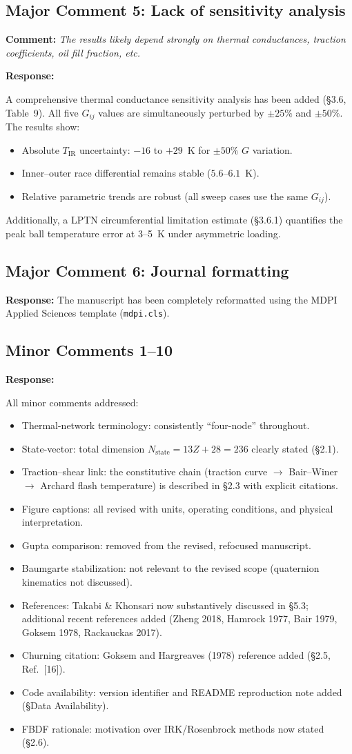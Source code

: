 \documentclass[11pt]{article}
\newcommand{\reviewer}[1]{\subsection*{#1}}
\newcommand{\comment}[1]{\textbf{Comment:} \textit{#1}\par\medskip}
\newcommand{\response}[1]{\textbf{Response:} \textcolor{response}{#1}\par\bigskip}
\begin{document}
\reviewer{Major Comment 5: Lack of sensitivity analysis}

\comment{The results likely depend strongly on thermal conductances, traction coefficients, oil fill fraction, etc.}

\response{A comprehensive thermal conductance sensitivity analysis has been added (\S3.6, Table~9). All five $G_{ij}$ values are simultaneously perturbed by $\pm 25\%$ and $\pm 50\%$. The results show:
\begin{itemize}[nosep]
    \item Absolute $T_{\text{IR}}$ uncertainty: $-16$ to $+29$~K for $\pm 50\%$ $G$ variation.
    \item Inner--outer race differential remains stable ($5.6$--$6.1$~K).
    \item Relative parametric trends are robust (all sweep cases use the same $G_{ij}$).
\end{itemize}
Additionally, a LPTN circumferential limitation estimate (\S3.6.1) quantifies the peak ball temperature error at 3--5~K under asymmetric loading.}


\reviewer{Major Comment 6: Journal formatting}

\response{The manuscript has been completely reformatted using the MDPI Applied Sciences template (\texttt{mdpi.cls}).}


\reviewer{Minor Comments 1--10}

\response{All minor comments addressed:
\begin{itemize}[nosep]
    \item[\textbf{1.}] Thermal-network terminology: consistently ``four-node'' throughout.
    \item[\textbf{2.}] State-vector: total dimension $N_{\text{state}} = 13Z + 28 = 236$ clearly stated (\S2.1).
    \item[\textbf{3.}] Traction--shear link: the constitutive chain (traction curve $\to$ Bair--Winer $\to$ Archard flash temperature) is described in \S2.3 with explicit citations.
    \item[\textbf{4.}] Figure captions: all revised with units, operating conditions, and physical interpretation.
    \item[\textbf{5.}] Gupta comparison: removed from the revised, refocused manuscript.
    \item[\textbf{6.}] Baumgarte stabilization: not relevant to the revised scope (quaternion kinematics not discussed).
    \item[\textbf{7.}] References: Takabi \& Khonsari now substantively discussed in \S5.3; additional recent references added (Zheng 2018, Hamrock 1977, Bair 1979, Goksem 1978, Rackauckas 2017).
    \item[\textbf{8.}] Churning citation: Goksem and Hargreaves (1978) reference added (\S2.5, Ref.~[16]).
    \item[\textbf{9.}] Code availability: version identifier and README reproduction note added (\S Data Availability).
    \item[\textbf{10.}] FBDF rationale: motivation over IRK/Rosenbrock methods now stated (\S2.6).
\end{itemize}}
\end{document}
